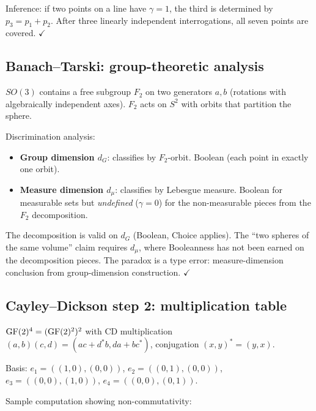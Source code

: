 Inference: if two points on a line have $\gamma = 1$,
the third is determined by $p_3 = p_1 + p_2$.
After three linearly independent interrogations, all
seven points are covered. $\checkmark$

\subsection{Banach--Tarski: group-theoretic analysis}
\label{app:banach-tarski}

$SO(3)$ contains a free subgroup $F_2$ on two generators
$a, b$ (rotations with algebraically independent axes).
$F_2$ acts on $S^2$ with orbits that partition the sphere.

Discrimination analysis:
\begin{itemize}[nosep]
  \item \textbf{Group dimension $d_G$}: classifies by
    $F_2$-orbit. Boolean (each point in exactly one orbit).
  \item \textbf{Measure dimension $d_\mu$}: classifies by
    Lebesgue measure. Boolean for measurable sets but
    \emph{undefined} ($\gamma = 0$) for the non-measurable
    pieces from the $F_2$ decomposition.
\end{itemize}

The decomposition is valid on $d_G$ (Boolean, Choice
applies). The ``two spheres of the same volume'' claim
requires $d_\mu$, where Booleanness has not been earned
on the decomposition pieces. The paradox is a type error:
measure-dimension conclusion from group-dimension
construction. $\checkmark$

\subsection{Cayley--Dickson step 2: multiplication table}
\label{app:cd-table}

$\operatorname{GF}(2)^4 = (\operatorname{GF}(2)^2)^2$ with CD multiplication
$(a,b)(c,d) = (ac + d^*b, da + bc^*)$,
conjugation $(x,y)^* = (y,x)$.

Basis: $e_1 = ((1,0),(0,0))$, $e_2 = ((0,1),(0,0))$,
$e_3 = ((0,0),(1,0))$, $e_4 = ((0,0),(0,1))$.

Sample computation showing non-commutativity:

